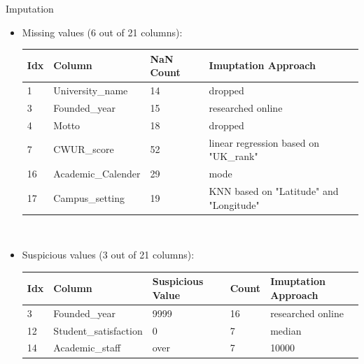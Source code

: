 \documentclass[xcolor=table]{beamer} %
\begin{document}
\begin{frame}{Imputation}
  \vspace{-1cm}
  \begin{itemize}
  \item Missing values (6 out of 21 columns):
    \begin{table}[h]
      \centering
      \tiny
      \begin{tabular}{l|l|l|l}
        Idx & Column             & NaN Count & Imuptation Approach \\
        \hline
        1   & University\_name   & 14        & dropped \\
        3   & Founded\_year      & 15        & researched online \\
        4   & Motto              & 18        & dropped \\
        7   & CWUR\_score        & 52        & linear regression based on "UK\_rank" \\
        16  & Academic\_Calender & 29        & mode \\
        17  & Campus\_setting    & 19        & KNN based on "Latitude" and "Longitude"
      \end{tabular}\hfill\
      \label{tab:missing_values_nan}
    \end{table}
  \item Suspicious values (3 out of 21 columns):
    \begin{table}[h]
      \centering
      \tiny
      \begin{tabular}{l|l|l|l|l}
        Idx & Column                & Suspicious Value & Count & Imuptation Approach \\
        \hline
        3   & Founded\_year         & 9999             & 16    & researched online \\
        12  & Student\_satisfaction & 0                & 7     & median \\
        14  & Academic\_staff       & over             & 7     & 10000 \\
      \end{tabular}\hfill\
      \label{tab:missing_values_zero}
    \end{table}
  \end{itemize}
\end{frame}
\end{document}
